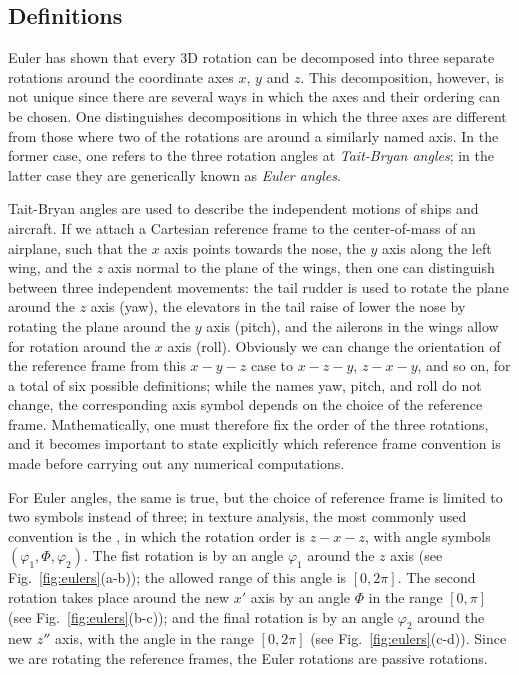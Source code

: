\subsection{Definitions}
Euler has shown that every 3D rotation can be decomposed into three separate rotations around the coordinate axes $x$, $y$ and $z$. This decomposition, however, is not unique since there are several ways in which the axes and their ordering can be chosen.  One distinguishes decompositions in which the three axes are different from those where two of the rotations are around a similarly named axis.  In the former case, one refers to the three rotation angles at \textit{Tait-Bryan angles}; in the latter case they are generically known as \textit{Euler angles}.  

Tait-Bryan angles are used to describe the independent motions of ships and aircraft.  If we attach a Cartesian reference frame to the center-of-mass of an airplane, such that the $x$ axis points towards the nose, the $y$ axis along the left wing, and the $z$ axis normal to the plane of the wings, then one can distinguish between three independent movements: the tail rudder is used to rotate the plane around the $z$ axis (yaw), the elevators in the tail raise of lower the nose by rotating the plane around the $y$ axis (pitch), and the ailerons in the wings allow for rotation around the $x$ axis (roll).  Obviously we can change the orientation of the reference frame from this $x-y-z$ case to $x-z-y$, $z-x-y$, and so on, for a total of six possible definitions; while the names yaw, pitch, and roll do not change, the corresponding axis symbol depends on the choice of the reference frame.  Mathematically, one must therefore fix the order of the three rotations, and it becomes important to state explicitly which reference frame convention is made before carrying out any numerical computations.

For Euler angles, the same is true, but the choice of reference frame is limited to two symbols instead of three; in texture analysis, the most commonly used convention is the , in which the rotation order is $z-x-z$, with angle symbols $(\varphi_1,\Phi,\varphi_2)$.  The fist rotation is by an angle $\varphi_1$ around the $z$ axis (see Fig.~\ref{fig:eulers}(a-b)); the allowed range of this angle is $[0,2\pi]$. The second rotation takes place around the new $x'$ axis by an angle $\Phi$ in the range $[0,\pi]$ (see Fig.~\ref{fig:eulers}(b-c)); and the final rotation is by an angle $\varphi_2$ around the new $z''$ axis, with the angle in the range $[0,2\pi]$ (see Fig.~\ref{fig:eulers}(c-d)).  Since we are rotating the reference frames, the Euler rotations are passive rotations.

